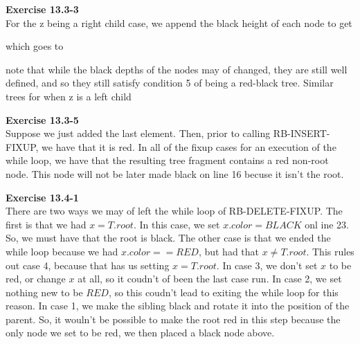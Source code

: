 \documentclass{article}
\begin{document}
\noindent\textbf{ Exercise 13.3-3} \\
For the z being a right child case, we append the black height of each node to get

which goes to


note that while the black depths of the nodes may of changed, they are still well defined, and so they still satisfy condition 5 of being a red-black tree. Similar trees for when z is a left child

\noindent\textbf{ Exercise 13.3-5} \\
Suppose we just added the last element. Then, prior to calling RB-INSERT-FIXUP, we have that it is red. In all of the fixup cases for an execution of the while loop, we have that the resulting tree fragment contains a red non-root node. This node will not be later made black on line 16 becuse it isn't the root. 

\noindent\textbf{ Exercise 13.4-1} \\
There are two ways we may of left the while loop of RB-DELETE-FIXUP. The first is that we had $x = T.root$. In this case, we set $x.color = BLACK$ onl ine 23. So, we must have that the root is black. The other case is that we ended the while loop because we had $x.color == RED$, but had that $x\neq T.root$. This rules out case 4, because that has us setting $x=T.root$. In case 3, we don't set $x$ to be red, or change $x$ at all, so it coudn't of been the last case run. In case 2, we set nothing new to be $RED$, so this coudn't lead to exiting the while loop for this reason. In case 1, we make the sibling black and rotate it into the position of the parent. So, it wouln't be possible to make the root red in this step because the only node we set to be red, we then placed a black node above. 
\end{document}
